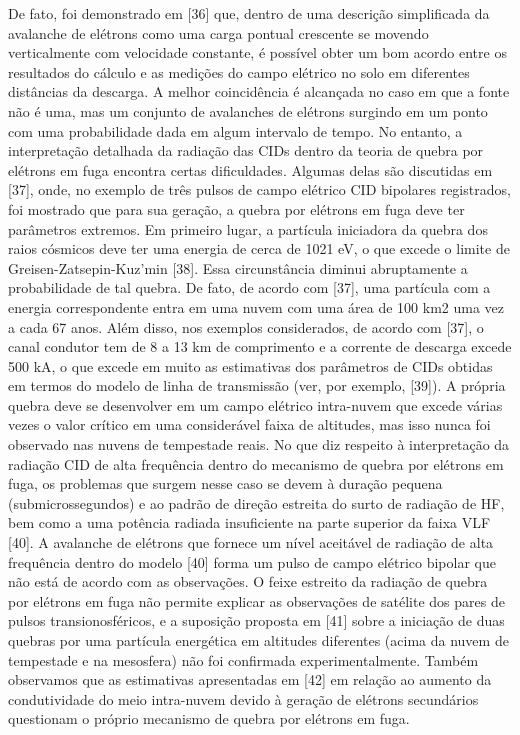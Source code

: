 \documentclass[a4paper, 12pt, onecolumn,singlespacing]{article}
\begin{document}
	De fato, foi demonstrado em [36] que, dentro de uma descrição simplificada da avalanche de elétrons como uma carga pontual crescente se movendo verticalmente com velocidade constante, é possível obter um bom acordo entre os resultados do cálculo e as medições do campo elétrico no solo em diferentes distâncias da descarga. A melhor coincidência é alcançada no caso em que a fonte não é uma, mas um conjunto de avalanches de elétrons surgindo em um ponto com uma probabilidade dada em algum intervalo de tempo. No entanto, a interpretação detalhada da radiação das CIDs dentro da teoria de quebra por elétrons em fuga encontra certas dificuldades. Algumas delas são discutidas em [37], onde, no exemplo de três pulsos de campo elétrico CID bipolares registrados, foi mostrado que para sua geração, a quebra por elétrons em fuga deve ter parâmetros extremos. Em primeiro lugar, a partícula iniciadora da quebra dos raios cósmicos deve ter uma energia de cerca de 1021 eV, o que excede o limite de Greisen-Zatsepin-Kuz'min [38]. Essa circunstância diminui abruptamente a probabilidade de tal quebra. De fato, de acordo com [37], uma partícula com a energia correspondente entra em uma nuvem com uma área de 100 km2 uma vez a cada 67 anos. Além disso, nos exemplos considerados, de acordo com [37], o canal condutor tem de 8 a 13 km de comprimento e a corrente de descarga excede 500 kA, o que excede em muito as estimativas dos parâmetros de CIDs obtidas em termos do modelo de linha de transmissão (ver, por exemplo, [39]). A própria quebra deve se desenvolver em um campo elétrico intra-nuvem que excede várias vezes o valor crítico em uma considerável faixa de altitudes, mas isso nunca foi observado nas nuvens de tempestade reais. No que diz respeito à interpretação da radiação CID de alta frequência dentro do mecanismo de quebra por elétrons em fuga, os problemas que surgem nesse caso se devem à duração pequena (submicrossegundos) e ao padrão de direção estreita do surto de radiação de HF, bem como a uma potência radiada insuficiente na parte superior da faixa VLF [40]. A avalanche de elétrons que fornece um nível aceitável de radiação de alta frequência dentro do modelo [40] forma um pulso de campo elétrico bipolar que não está de acordo com as observações. O feixe estreito da radiação de quebra por elétrons em fuga não permite explicar as observações de satélite dos pares de pulsos transionosféricos, e a suposição proposta em [41] sobre a iniciação de duas quebras por uma partícula energética em altitudes diferentes (acima da nuvem de tempestade e na mesosfera) não foi confirmada experimentalmente. Também observamos que as estimativas apresentadas em [42] em relação ao aumento da condutividade do meio intra-nuvem devido à geração de elétrons secundários questionam o próprio mecanismo de quebra por elétrons em fuga.
	
\end{document}
